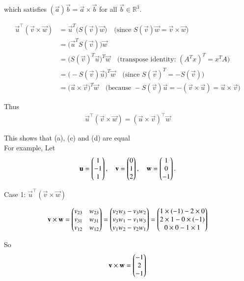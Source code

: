 \documentclass[journal]{IEEEtran}
\begin{document}
which satisfies $(\vec{a})\vec{b}=\vec{a}\times\vec{b}$  for all $\vec{b}\in\mathbb{R}^3$.


\begin{align}
\vec{u}^\top(\vec{v}\times\vec{w})
&= \vec{u}^T\big(S(\vec{v})\vec{w}\big)
\quad\text{(since }S(\vec{v})\vec{w}=\vec{v}\times\vec{w}\text{)}\\ 
&= \big(\vec{u}^T S(\vec{v})\big)\vec{w} \\ 
&= \big(S(\vec{v})^T\vec{u}\big)^T\vec{w}
\quad\text{(transpose identity: }(A^T x)^T = x^T A\text{)}\\ 
&= \big(-S(\vec{v})\vec{u}\big)^T\vec{w}
\quad\text{(since }S(\vec{v})^T=-S(\vec{v})\text{)}\\ 
&= \big(\vec{u}\times\vec{v}\big)^T\vec{w}
\quad\text{(because }-S(\vec{v})\vec{u} = -(\vec{v}\times\vec{u}) = \vec{u}\times\vec{v})
\end{align}

Thus
\begin{align}
\vec{u}^\top(\vec{v}\times\vec{w}) = (\vec{u}\times\vec{v})^\top\vec{w}
\end{align}

This shows that (a), (c) and (d) are equal \\ 

For example,
Let
\begin{align}
\mathbf{u}=\begin{pmatrix}1 \\ -1 \\ 1\end{pmatrix}, \quad \mathbf{v}=\begin{pmatrix}0 \\ 1 \\ 2\end{pmatrix}, \quad \mathbf{w}=\begin{pmatrix}1 \\ 0 \\ -1\end{pmatrix}.
\end{align}

Case 1: $\vec{u} ^\top (\vec{v} \times \vec{w})$

\begin{align}
\mathbf{v} \times \mathbf{w} =
\begin{pmatrix}
v_{23} & w_{23} \\
v_{31} & w_{31} \\
v_{12} & w_{12}
\end{pmatrix}
=
\begin{pmatrix}
v_2 w_3 - v_3 w_2 \\
v_3 w_1 - v_1 w_3 \\
v_1 w_2 - v_2 w_1
\end{pmatrix}
=
\begin{pmatrix}
1 \times (-1) - 2 \times 0 \\
2 \times 1 - 0 \times (-1) \\
0 \times 0 - 1 \times 1
\end{pmatrix}
\end{align}


So
\begin{align}
\mathbf{v}\times \mathbf{w} = \begin{pmatrix}-1 \\ 2 \\ -1\end{pmatrix}
\end{align}
\end{document}
